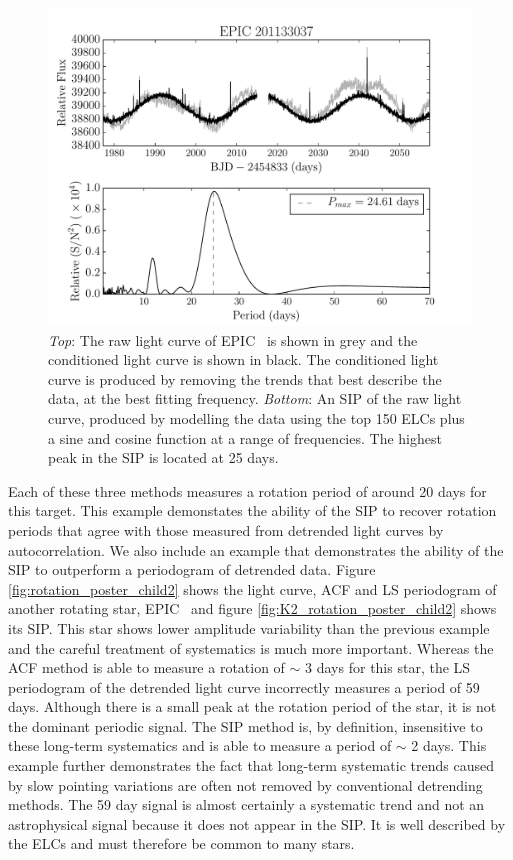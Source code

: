 \begin{figure}
\begin{center}
\includegraphics[width=6in, clip=true]{figures/K2_rotation_201133037.pdf}
\caption[Example 1: A SIP with a conditioned light curve.]
{{\it Top}: The raw light curve of EPIC \rpc\ is shown in grey and
	the conditioned light curve is shown in black. The conditioned light
	curve is produced by removing the trends that best describe the
	data, at the best fitting frequency. {\it Bottom}: An SIP of the raw
	light curve, produced by modelling the data using the top 150 ELCs
	plus a sine and cosine function at a range of frequencies.
	The highest peak in the SIP is located at 25 days.}
\label{fig:K2_rotation_poster_child}
\end{center}
\end{figure}

Each of these three methods measures a rotation period of around 20 days for
this target.
This example demonstates the ability of the SIP to recover rotation periods
that agree with those measured from detrended light curves by autocorrelation.
We also include an example that demonstrates the ability of the SIP to
outperform a periodogram of detrended data.
Figure \ref{fig:rotation_poster_child2} shows the light curve, ACF and LS
periodogram of another rotating star, EPIC \rpcc\ and figure
\ref{fig:K2_rotation_poster_child2} shows its SIP.
This star shows lower amplitude variability than the previous example and the
careful treatment of systematics is much more important.
Whereas the ACF method is able to measure a rotation of $\sim$ 3 days for
this star, the LS periodogram of the detrended light curve incorrectly
measures a period of 59 days.
Although there is a small peak at the rotation period of the star, it is not
the dominant periodic signal.
The SIP method is, by definition, insensitive to these long-term systematics
and is able to measure a period of $\sim$ 2 days.
This example further demonstrates the fact that long-term systematic trends
caused by slow pointing variations are often not removed by conventional
detrending methods.
The 59 day signal is almost certainly a systematic trend and not an
astrophysical signal because it does not appear in the SIP.
It is well described by the ELCs and must therefore be common to many stars.

